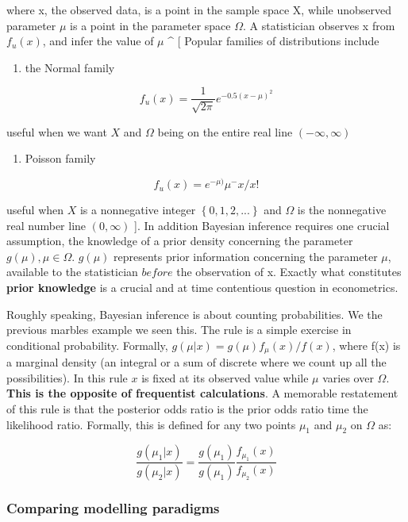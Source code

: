 \documentclass{article}
\begin{document}
where x, the observed data, is a point in the sample space X, while
unobserved parameter \(\mu\) is a point in the parameter space
\(\Omega\). A statistician observes x from \(f_u(x)\), and infer the
value of \(\mu\) \^{} {[} Popular families of distributions include

\begin{enumerate}
\def\labelenumi{\arabic{enumi}.}
\tightlist
\item
  the Normal family
\end{enumerate}

\[f_u(x)=\frac{1}{\sqrt{2 \pi}} e^{-0.5(x-\mu)^2}\]

useful when we want \(X\) and \(\Omega\) being on the entire real line
\((-\infty,\infty)\)

\begin{enumerate}
\def\labelenumi{\arabic{enumi}.}
\setcounter{enumi}{1}
\tightlist
\item
  Poisson family
\end{enumerate}

\[f_u(x)=e^{-\mu)}\mu^-x/x!\]

useful when \(X\) is a nonnegative integer \(\left\{0,1,2,...\right\}\)
and \(\Omega\) is the nonnegative real number line \((0,\infty)\) {]}.
In addition Bayesian inference requires one crucial assumption, the
knowledge of a prior density concerning the parameter
\(g(\mu),\mu \in \Omega\). \(g(\mu)\) represents prior information
concerning the parameter \(\mu\), available to the statistician
\(before\) the observation of x. Exactly what constitutes \textbf{prior
knowledge} is a crucial and at time contentious question in
econometrics.

Roughly speaking, Bayesian inference is about counting probabilities. We
the previous marbles example we seen this. The rule is a simple exercise
in conditional probability. Formally,
\(g(\mu|x)=g(\mu)f_{\mu}(x)/f(x)\), where f(x) is a marginal density (an
integral or a sum of discrete where we count up all the possibilities).
In this rule \(x\) is fixed at its observed value while \(\mu\) varies
over \(\Omega\). \textbf{This is the opposite of frequentist
calculations}. A memorable restatement of this rule is that the
posterior odds ratio is the prior odds ratio time the likelihood ratio.
Formally, this is defined for any two points \(\mu_1\) and \(\mu_2\) on
\(\Omega\) as:

\[\frac{g(\mu_1|x)}{g(\mu_2|x)}=\frac{g(\mu_1)}{g(\mu_1)}\frac{f_{\mu_1}(x)}{f_{\mu_2}(x)}\]

\hypertarget{comparing-modelling-paradigms}{%
\subsubsection{Comparing modelling
paradigms}\label{comparing-modelling-paradigms}}
\end{document}

